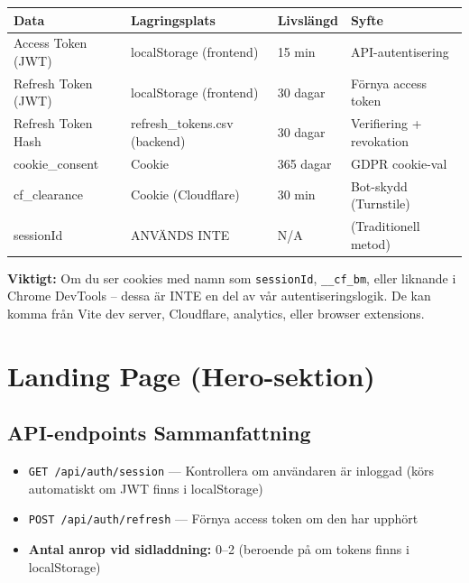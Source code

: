 \documentclass[12pt,a4paper]{article}
\begin{document}
\begin{center}
\begin{tabular}{|l|l|l|l|}
\hline
\textbf{Data} & \textbf{Lagringsplats} & \textbf{Livslängd} & \textbf{Syfte} \\
\hline
Access Token (JWT) & localStorage (frontend) & 15 min & API-autentisering \\
\hline
Refresh Token (JWT) & localStorage (frontend) & 30 dagar & Förnya access token \\
\hline
Refresh Token Hash & refresh\_tokens.csv (backend) & 30 dagar & Verifiering + revokation \\
\hline
cookie\_consent & Cookie & 365 dagar & GDPR cookie-val \\
\hline
cf\_clearance & Cookie (Cloudflare) & 30 min & Bot-skydd (Turnstile) \\
\hline
sessionId & ANVÄNDS INTE & N/A & (Traditionell metod) \\
\hline
\end{tabular}
\end{center}

\textbf{Viktigt:} Om du ser cookies med namn som \texttt{sessionId}, \texttt{\_\_cf\_bm}, eller liknande i Chrome DevTools -- dessa är INTE en del av vår autentiseringslogik. De kan komma från Vite dev server, Cloudflare, analytics, eller browser extensions.

\newpage



\section{Landing Page (Hero-sektion)}

\subsection{API-endpoints Sammanfattning}
\begin{itemize}[noitemsep]
  \item \texttt{GET /api/auth/session} — Kontrollera om användaren är inloggad (körs automatiskt om JWT finns i localStorage)
  \item \texttt{POST /api/auth/refresh} — Förnya access token om den har upphört
  \item \textbf{Antal anrop vid sidladdning:} 0–2 (beroende på om tokens finns i localStorage)
\end{itemize}
\end{document}
